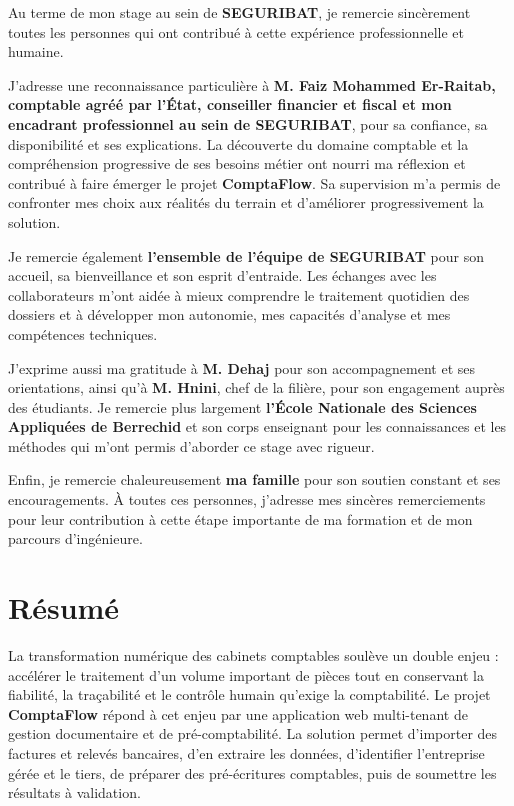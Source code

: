 \documentclass[12pt,a4paper,oneside]{report}
\begin{document}
Au terme de mon stage au sein de \textbf{SEGURIBAT}, je remercie sincèrement toutes les personnes qui ont contribué à cette expérience professionnelle et humaine.

J'adresse une reconnaissance particulière à \textbf{M. Faiz Mohammed Er-Raitab, comptable agréé par l'État, conseiller financier et fiscal et mon encadrant professionnel au sein de SEGURIBAT}, pour sa confiance, sa disponibilité et ses explications. La découverte du domaine comptable et la compréhension progressive de ses besoins métier ont nourri ma réflexion et contribué à faire émerger le projet \textbf{ComptaFlow}. Sa supervision m'a permis de confronter mes choix aux réalités du terrain et d'améliorer progressivement la solution.

Je remercie également \textbf{l'ensemble de l'équipe de SEGURIBAT} pour son accueil, sa bienveillance et son esprit d'entraide. Les échanges avec les collaborateurs m'ont aidée à mieux comprendre le traitement quotidien des dossiers et à développer mon autonomie, mes capacités d'analyse et mes compétences techniques.

J'exprime aussi ma gratitude à \textbf{M. Dehaj} pour son accompagnement et ses orientations, ainsi qu'à \textbf{M. Hnini}, chef de la filière, pour son engagement auprès des étudiants. Je remercie plus largement \textbf{l'École Nationale des Sciences Appliquées de Berrechid} et son corps enseignant pour les connaissances et les méthodes qui m'ont permis d'aborder ce stage avec rigueur.

Enfin, je remercie chaleureusement \textbf{ma famille} pour son soutien constant et ses encouragements. À toutes ces personnes, j'adresse mes sincères remerciements pour leur contribution à cette étape importante de ma formation et de mon parcours d'ingénieure.

\chapter*{Résumé}

La transformation numérique des cabinets comptables soulève un double enjeu : accélérer le traitement d'un volume important de pièces tout en conservant la fiabilité, la traçabilité et le contrôle humain qu'exige la comptabilité. Le projet \textbf{ComptaFlow} répond à cet enjeu par une application web multi-tenant de gestion documentaire et de pré-comptabilité. La solution permet d'importer des factures et relevés bancaires, d'en extraire les données, d'identifier l'entreprise gérée et le tiers, de préparer des pré-écritures comptables, puis de soumettre les résultats à validation.
\end{document}
